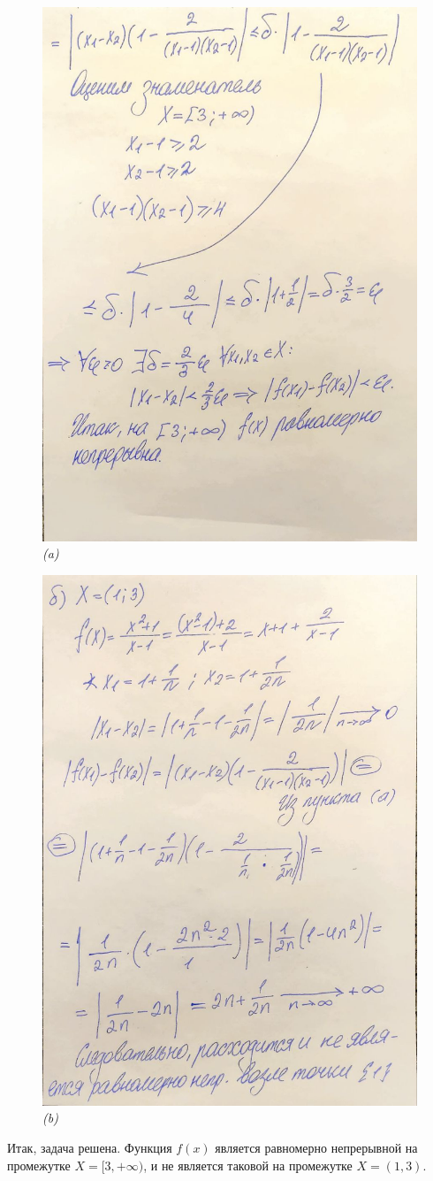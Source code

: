 \documentclass[a4paper,12pt]{article}
\begin{document}
\begin{figure}[H]
    \centering
    \includegraphics[width=0.8\linewidth]{../img/1_2.jpg}
    \caption{\emph{(a)}}
    \label{fig:part2}
\end{figure}

\begin{figure}[H]
    \centering
    \includegraphics[width=0.8\linewidth]{../img/1_3.jpg}
    \caption{\emph{(b)}}
    \label{fig:part3}
\end{figure}

Итак, задача решена. Функция \( f(x) \) является равномерно непрерывной на промежутке \(X = [3,+\infty)\), и не является таковой на промежутке \( X = (1,3) \).
\end{document}
